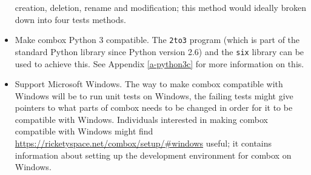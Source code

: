 \begin{itemize}
  creation, deletion, rename and modification; this method would
  ideally broken down into four tests methods.
\item Make combox Python 3 compatible. The \verb+2to3+ program (which
  is part of the standard Python library since Python version 2.6) and
  the \verb+six+ library can be used to achieve this. See Appendix
  \ref{a-python3c} for more information on this.
\item Support Microsoft Windows. The way to make combox compatible
  with Windows will be to run unit tests on Windows, the failing tests
  might give pointers to what parts of combox needs to be changed in
  order for it to be compatible with Windows. Individuals interested
  in making combox compatible with Windows might find
  \url{https://ricketyspace.net/combox/setup/#windows} useful; it
  contains information about setting up the development environment
  for combox on Windows.
\end{itemize}

